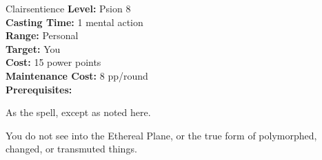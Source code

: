 {Clairsentience}
{
	\textbf{Level:}
	Psion 8\\
	\textbf{Casting Time:}
	1 mental action\\
	\textbf{Range:}
	Personal\\
	\textbf{Target:}
	You\\
	\textbf{Cost:}
	15 power points\\
	\textbf{Maintenance Cost:}
	8 pp/round\\
	\textbf{Prerequisites:}
	\\
}
{
	As the  spell, except as noted here.

	You do not see into the Ethereal Plane, or the true form of polymorphed, changed, or transmuted things.
}